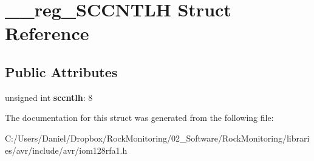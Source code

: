 \hypertarget{struct____reg___s_c_c_n_t_l_h}{}\section{\+\_\+\+\_\+reg\+\_\+\+S\+C\+C\+N\+T\+LH Struct Reference}
\label{struct____reg___s_c_c_n_t_l_h}
\subsection*{Public Attributes}
\begin{DoxyCompactItemize}
\item 
unsigned int {\bfseries sccntlh}\+: 8\hypertarget{struct____reg___s_c_c_n_t_l_h_a907c86828433e282c752bec9129ec740}{}\label{struct____reg___s_c_c_n_t_l_h_a907c86828433e282c752bec9129ec740}

\end{DoxyCompactItemize}


The documentation for this struct was generated from the following file\+:\begin{DoxyCompactItemize}
\item 
C\+:/\+Users/\+Daniel/\+Dropbox/\+Rock\+Monitoring/02\+\_\+\+Software/\+Rock\+Monitoring/libraries/avr/include/avr/iom128rfa1.\+h\end{DoxyCompactItemize}
